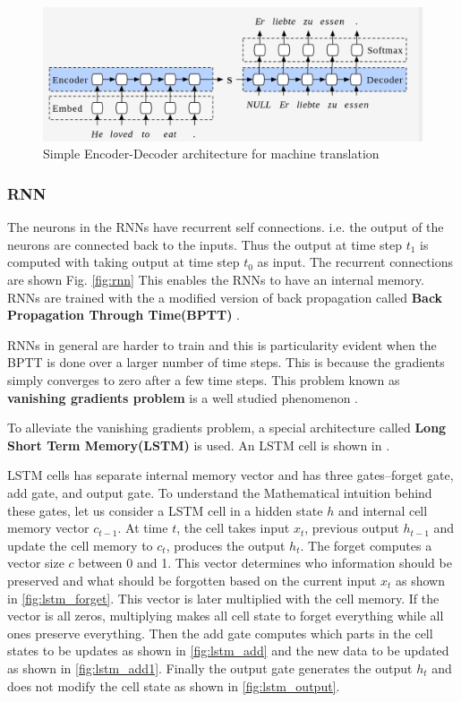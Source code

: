\documentclass[a4paper]{article}
\begin{document}
\begin{figure}
  \includegraphics[width=.99\linewidth]{img/enc_dec.png}
  \caption{Simple Encoder-Decoder architecture for machine translation}
  \label{fig:enc_dec}
\end{figure}


\subsubsection{RNN}

The neurons  in the RNNs have recurrent self connections. i.e. the output of the
neurons  are connected back to the inputs. Thus the output at time step $t_1$ is
computed  with taking  output  at  time  step  $t_0$  as  input.  The  recurrent
connections  are  shown  Fig. \ref{fig:rnn}  This  enables  the RNNs to have  an
internal  memory.  RNNs  are  trained  with  the  a  modified  version  of  back
propagation     called    \textbf{Back    Propagation     Through    Time(BPTT)}
\cite{werbos1990backpropagation}.

RNNs in general are harder  to train and this is particularity evident when  the
BPTT is done over a larger number of time  steps. This is because  the gradients
simply converges to  zero  after  a  few  time  steps.  This  problem  known  as
\textbf{vanishing   gradients   problem}   is   a    well   studied   phenomenon
\cite{bengio1994learning}.

To alleviate  the  vanishing  gradients problem,  a special  architecture called
\textbf{Long Short Term Memory(LSTM)} \cite{hochreiter1997long} is used. An LSTM
cell is shown in \label{fig:lstm}.

LSTM cells has separate internal memory vector and has three gates--forget gate,
add gate, and output gate. To understand the Mathematical intuition behind these
gates,  let us consider  a LSTM cell in  a  hidden state  $h$  and internal cell
memory  vector $c_{t-1}$. At  time $t$, the cell  takes  input  $x_t$,  previous
output  $h_{t-1}$  and  update the  cell memory to $c_{t}$,  produces the output
$h_{t}$. The forget computes a vector  size $c$ between  0  and  1. This  vector
determines who  information should be  preserved  and  what  should be forgotten
based on the current input  $x_t$ as shown in \ref{fig:lstm_forget}. This vector
is  later  multiplied with  the  cell  memory.  If  the  vector  is  all  zeros,
multiplying makes all  cell  state to forget everything while all ones  preserve
everything.  Then  the add gate computes which  parts in  the cell  states to be
updates as shown in  \ref{fig:lstm_add} and the new  data to be updated as shown
in \ref{fig:lstm_add1}. Finally  the output gate generates the output  $h_t$ and
does not modify the cell state as shown in \ref{fig:lstm_output}.
\end{document}
